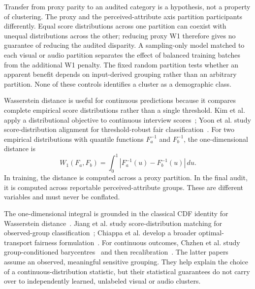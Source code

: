 Transfer from proxy parity to an audited category is a hypothesis, not a property of clustering.
The proxy and the perceived-attribute axis partition participants differently. Equal score
distributions across one partition can coexist with unequal distributions across the other;
reducing proxy W1 therefore gives no guarantee of reducing the audited disparity. A
sampling-only model matched to each visual or audio partition separates the effect of balanced
training batches from the additional W1 penalty. The fixed random partition tests whether an
apparent benefit depends on input-derived grouping rather than an arbitrary partition. None of
these controls identifies a cluster as a demographic class.

Wasserstein distance is useful for continuous predictions because it compares complete empirical
score distributions rather than a single threshold. Kim et al. apply a distributional objective
to continuous interview scores~\cite{Kim2023}; Yoon et al. study score-distribution alignment
for threshold-robust fair classification~\cite{Yoon2020}. For two empirical distributions with
quantile functions $F^{-1}_a$ and $F^{-1}_b$, the one-dimensional distance is
\begin{equation}
    W_1(F_a,F_b)=\int_0^1\left|F^{-1}_a(u)-F^{-1}_b(u)\right|\,du.
\end{equation}
In training, the distance is computed across a proxy partition. In the final audit, it is computed
across reportable perceived-attribute groups. These are different variables and must never be
conflated.

The one-dimensional integral is grounded in the classical CDF identity for Wasserstein
distance~\cite{Vallender1974}. Jiang et al. study score-distribution matching for
observed-group classification~\cite{Jiang2020Wasserstein}; Chiappa et al. develop a broader
optimal-transport fairness formulation~\cite{Chiappa2020OT}. For continuous outcomes, Chzhen et
al. study group-conditioned barycentres~\cite{Chzhen2020Barycenters} and then
recalibration~\cite{Chzhen2020Recalibration}.
The latter papers assume an observed, meaningful sensitive grouping. They help explain the
choice of a continuous-distribution statistic, but their statistical guarantees do not carry
over to independently learned, unlabeled visual or audio clusters.

